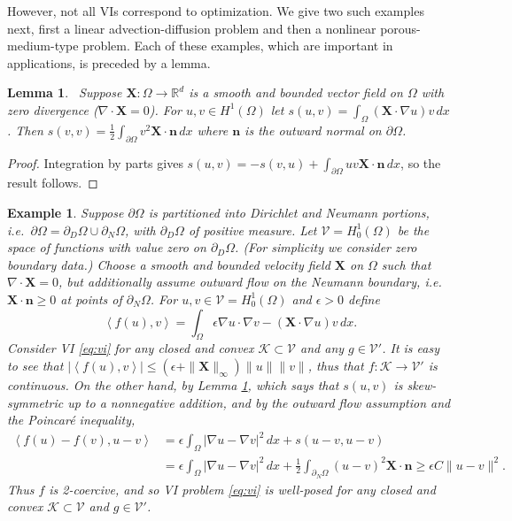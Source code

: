 \documentclass[letterpaper,final,12pt,reqno]{amsart}
\theoremstyle{cstyle}
\newtheorem{lemma}[theorem]{Lemma}
\theoremstyle{cstyle*}
\theoremstyle{dstyle}
\newtheorem{example}[theorem]{Example}
\numberwithin{equation}{section}
\numberwithin{figure}{section}
\numberwithin{table}{section}
\numberwithin{theorem}{section}
\newcommand{\eps}{\epsilon}
\newcommand{\RR}{\mathbb{R}}
\newcommand{\grad}{\nabla}
\newcommand{\Div}{\nabla\cdot}
\newcommand{\bn}{\mathbf{n}}
\newcommand{\bX}{\mathbf{X}}
\newcommand{\cK}{\mathcal{K}}
\newcommand{\cV}{\mathcal{V}}
\newcommand{\ip}[2]{\left<#1,#2\right>}
\begin{document}
However, not all VIs correspond to optimization.  We give two such examples next, first a linear advection-diffusion problem and then a nonlinear porous-medium-type problem.  Each of these examples, which are important in applications, is preceded by a lemma.

\begin{lemma}  \label{lem:advectionskew}  \cite{Elmanetal2014}\,  Suppose $\bX :\Omega \to \RR^d$ is a smooth and bounded vector field on $\Omega$ with zero divergence ($\Div \bX=0$).  For $u,v \in H^1(\Omega)$ let $s(u,v) = \int_\Omega (\bX \cdot \grad u) v\,dx$.  Then $s(v,v) = \frac{1}{2} \int_{\partial \Omega} v^2 \bX\cdot \bn\,dx$ where $\bn$ is the outward normal on $\partial \Omega$.
\end{lemma}

\begin{proof}
Integration by parts gives $s(u,v) = - s(v,u) + \int_{\partial \Omega} uv \bX\cdot \bn\,dx$, so the result follows.
\end{proof}

\begin{example}  \label{ex:advectiondiffusion}  Suppose $\partial\Omega$ is partitioned into Dirichlet and Neumann portions, i.e.~$\partial\Omega = \partial_D\Omega \cup \partial_N\Omega$, with $\partial_D\Omega$ of positive measure.  Let $\cV = H_0^1(\Omega)$ be the space of functions with value zero on $\partial_D\Omega$.  (For simplicity we consider zero boundary data.)  Choose a smooth and bounded velocity field $\bX$ on $\Omega$ such that $\Div \bX=0$, but additionally assume outward flow on the Neumann boundary, i.e.~$\bX \cdot \bn \ge 0$ at points of $\partial_N\Omega$.  For $u,v \in \cV = H_0^1(\Omega)$ and $\eps>0$ define
\begin{equation}
\ip{f(u)}{v} = \int_\Omega \eps \grad u \cdot \grad v - (\bX \cdot \grad u) v\,dx. \label{eq:advectiondiffusion}
\end{equation}
Consider VI \eqref{eq:vi} for any closed and convex $\cK \subset \cV$ and any $g\in\cV'$.  It is easy to see that $|\ip{f(u)}{v}| \le (\eps + \|\bX\|_\infty) \|u\| \|v\|$, thus that $f:\cK \to \cV'$ is continuous.  On the other hand, by Lemma \ref{lem:advectionskew}, which says that $s(u,v)$ is skew-symmetric up to a nonnegative addition, and by the outward flow assumption and the Poincar\'e inequality,
\begin{align*}
\ip{f(u)-f(v)}{u-v} &= \eps \int_\Omega |\grad u - \grad v|^2\,dx + s(u-v,u-v) \\
                    &= \eps \int_\Omega |\grad u - \grad v|^2\,dx + \frac{1}{2} \int_{\partial_N\Omega} (u-v)^2 \bX\cdot\bn \ge \eps C \|u-v\|^2.
\end{align*}
Thus $f$ is 2-coercive, and so VI problem \eqref{eq:vi} is well-posed for any closed and convex $\cK \subset \cV$ and $g\in \cV'$.
\end{example}
\end{document}
